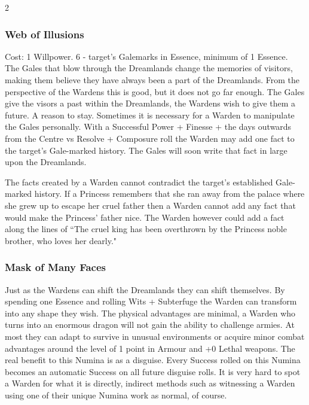 \begin{multicols}{2}
\subsubsection*{Web of Illusions}

Cost: 1 Willpower. 6 - target's Galemarks in Essence, minimum of 1 Essence.\\

\noindent The Gales that blow through the Dreamlands change the memories of visitors, making them believe they have always been a part of the Dreamlands. From the perspective of the Wardens this is good, but it does not go far enough. The Gales give the visors a past within the Dreamlands, the Wardens wish to give them a future. A reason to stay. Sometimes it is necessary for a Warden to manipulate the Gales personally. With a Successful Power + Finesse + the days outwards from the Centre vs Resolve + Composure roll the Warden may add one fact to the target's Gale-marked history. The Gales will soon write that fact in large upon the Dreamlands.

The facts created by a Warden cannot contradict the target's established Gale-marked history. If a Princess remembers that she ran away from the palace where she grew up to escape her cruel father then a Warden cannot add any fact that would make the Princess' father nice. The Warden however could add a fact along the lines of \textquotedblleft The cruel king has been overthrown by the Princess noble brother, who loves her dearly."

\subsubsection*{Mask of Many Faces}

Just as the Wardens can shift the Dreamlands they can shift themselves. By spending one Essence and rolling Wits + Subterfuge the Warden can transform into any shape they wish. The physical advantages are minimal, a Warden who turns into an enormous dragon will not gain the ability to challenge armies. At most they can adapt to survive in unusual environments or acquire minor combat advantages around the level of 1 point in Armour and +0 Lethal weapons. The real benefit to this Numina is as a disguise. Every Success rolled on this Numina becomes an automatic Success on all future disguise rolls. It is very hard to spot a Warden for what it is directly, indirect methods such as witnessing a Warden using one of their unique Numina work as normal, of course.


\end{multicols}

